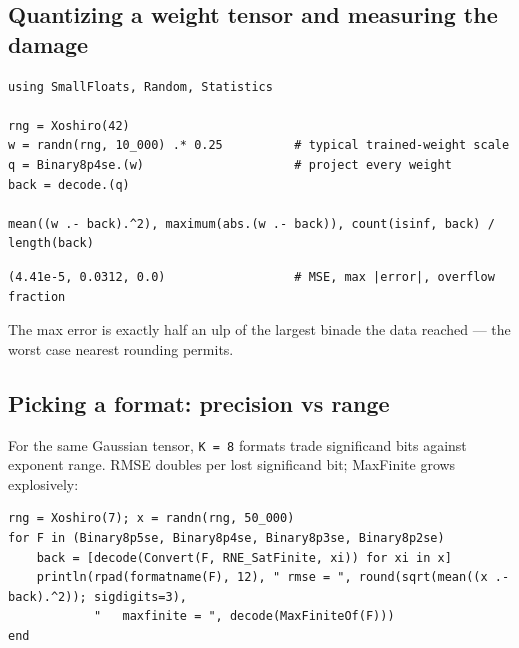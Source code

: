 \label{11381515430689351323}{}


\subsection{Quantizing a weight tensor and measuring the damage}



\label{12845276900436285715}{}



\begin{verbatim}
using SmallFloats, Random, Statistics

rng = Xoshiro(42)
w = randn(rng, 10_000) .* 0.25          # typical trained-weight scale
q = Binary8p4se.(w)                     # project every weight
back = decode.(q)

mean((w .- back).^2), maximum(abs.(w .- back)), count(isinf, back) / length(back)
\end{verbatim}




\begin{verbatim}
(4.41e-5, 0.0312, 0.0)                  # MSE, max |error|, overflow fraction
\end{verbatim}



The max error is exactly half an ulp of the largest binade the data reached — the worst case nearest rounding permits.



\subsection{Picking a format: precision vs range}



\label{9815972904090952286}{}


For the same Gaussian tensor, \texttt{K = 8} formats trade significand bits against exponent range. RMSE doubles per lost significand bit; MaxFinite grows explosively:




\begin{verbatim}
rng = Xoshiro(7); x = randn(rng, 50_000)
for F in (Binary8p5se, Binary8p4se, Binary8p3se, Binary8p2se)
    back = [decode(Convert(F, RNE_SatFinite, xi)) for xi in x]
    println(rpad(formatname(F), 12), " rmse = ", round(sqrt(mean((x .- back).^2)); sigdigits=3),
            "   maxfinite = ", decode(MaxFiniteOf(F)))
end
\end{verbatim}




